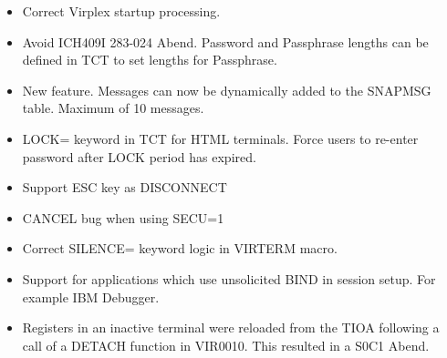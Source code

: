 \documentclass[letterpaper,10pt,english]{sphinxmanual}
\begin{document}
\begin{itemize}
\item {} 
Correct Virplex startup processing.

\end{itemize}

\begin{itemize}
\item {} 
Avoid ICH409I 283-024 Abend. Password and Passphrase lengths can be defined in TCT to set lengths for Passphrase.

\end{itemize}

\begin{itemize}
\item {} 
New feature. Messages can now be dynamically added to the SNAPMSG table. Maximum of 10 messages.

\end{itemize}

\begin{itemize}
\item {} 
LOCK= keyword in TCT for HTML terminals. Force users to re-enter password after LOCK period has expired.

\item {} 
Support ESC key as DISCONNECT

\item {} 
CANCEL bug when using SECU=1

\end{itemize}

\begin{itemize}
\item {} 
Correct SILENCE= keyword logic in VIRTERM macro.

\end{itemize}

\begin{itemize}
\item {} 
Support for applications which use unsolicited BIND in session setup. For example IBM Debugger.

\end{itemize}

\begin{itemize}
\item {} 
Registers in an inactive terminal were reloaded from the TIOA following a call of a DETACH function in VIR0010. This resulted in a S0C1 Abend.

\end{itemize}
\end{document}
